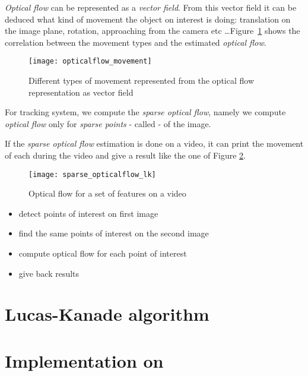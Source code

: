 \emph{Optical flow} can be represented as a \emph{vector field}. From this vector field it can be deduced what kind of movement the object on interest is doing: translation on the image plane, rotation, approaching from the camera etc \ldots Figure~\ref{opticalflow_movement} shows the correlation between the movement types and the estimated \emph{optical flow}.\par

\begin{figure}[h]
\centering
\texttt{[image: opticalflow\_movement]}
\caption{Different types of movement represented from the optical flow representation as vector field \cite{optical_flow_scholarpedia}}
\label{opticalflow_movement}
\end{figure}
\FloatBarrier

For \iBubble{} tracking system, we compute the \emph{sparse optical flow}, namely we compute \emph{optical flow} only for \emph{sparse points} - called  - of the image.

If the \emph{sparse optical flow} estimation is done on a video, it can print the movement of each  during the video and give a result like the one of Figure \ref{opticalflow_sparse}.\par

\begin{figure}[!htbp]
\centering
\texttt{[image: sparse\_opticalflow\_lk]}
\caption{Optical flow for a set of features on a video \cite{optical_flow_opencv}}
\label{opticalflow_sparse}
\end{figure}
\FloatBarrier

\begin{itemize}
	\item detect points of interest on first image
	\item find the same points of interest on the second image
	\item compute optical flow for each point of interest
	\item give back results
\end{itemize}



\section{Lucas-Kanade algorithm}


\section{Implementation on \vc}


